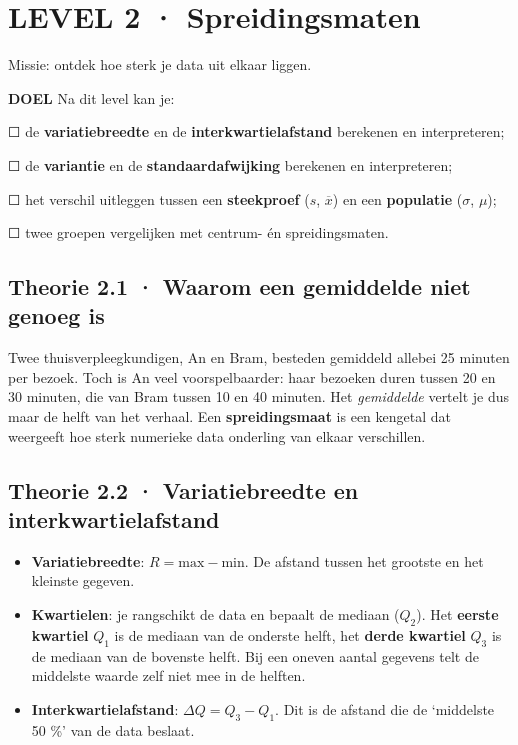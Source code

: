 \section{LEVEL 2 · Spreidingsmaten}

\begin{missie}
Missie: ontdek hoe sterk je data uit elkaar liggen.
\end{missie}

\begin{doel}
\textbf{DOEL} \quad Na dit level kan je:

☐ de \textbf{variatiebreedte} en de \textbf{interkwartielafstand} berekenen en interpreteren;

☐ de \textbf{variantie} en de \textbf{standaardafwijking} berekenen en interpreteren;

☐ het verschil uitleggen tussen een \textbf{steekproef} ($s$, $\overline{x}$) en een \textbf{populatie} ($\sigma$, $\mu$);

☐ twee groepen vergelijken met centrum- én spreidingsmaten.
\end{doel}

\subsection*{Theorie 2.1 · Waarom een gemiddelde niet genoeg is}

Twee thuisverpleegkundigen, An en Bram, besteden gemiddeld allebei 25 minuten per bezoek. Toch is An veel voorspelbaarder: haar bezoeken duren tussen 20 en 30 minuten, die van Bram tussen 10 en 40 minuten. Het \emph{gemiddelde} vertelt je dus maar de helft van het verhaal. Een \textbf{spreidingsmaat} is een kengetal dat weergeeft hoe sterk numerieke data onderling van elkaar verschillen.

\subsection*{Theorie 2.2 · Variatiebreedte en interkwartielafstand}

\begin{theorie}
\begin{itemize}
\item \textbf{Variatiebreedte}: $R=\text{max}-\text{min}$. De afstand tussen het grootste en het kleinste gegeven.
\item \textbf{Kwartielen}: je rangschikt de data en bepaalt de mediaan ($Q_2$). Het \textbf{eerste kwartiel} $Q_1$ is de mediaan van de onderste helft, het \textbf{derde kwartiel} $Q_3$ is de mediaan van de bovenste helft. Bij een oneven aantal gegevens telt de middelste waarde zelf niet mee in de helften.
\item \textbf{Interkwartielafstand}: $\Delta Q=Q_3-Q_1$. Dit is de afstand die de ‘middelste 50 \%’ van de data beslaat.
\end{itemize}
\end{theorie}

